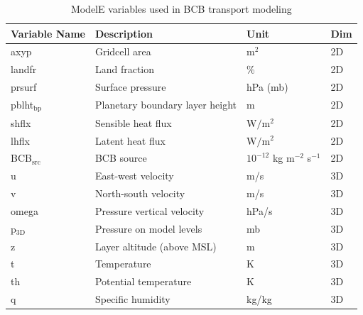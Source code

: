 \documentclass{article}
\begin{document}
    \begin{table}[htbp]
        \centering
        \caption{ModelE variables used in BCB transport modeling}
        \label{tab:model_variables}
        \begin{tabular}{llll}
            \hline
            Variable Name       & Description                       & Unit                               & Dim \\ \hline
            axyp                & Gridcell area                     & $\text{m}^2$                       & 2D  \\
            landfr              & Land fraction                     & \%                                 & 2D  \\
            prsurf              & Surface pressure                  & hPa (mb)                           & 2D  \\
            pblht$_{\text{bp}}$ & Planetary boundary layer height   & m                                  & 2D  \\
            shflx               & Sensible heat flux                & $\text{W}/\text{m}^2$              & 2D  \\
            lhflx               & Latent heat flux                  & $\text{W}/\text{m}^2$              & 2D  \\
            BCB$_{\text{src}}$  & BCB source                        & $10^{-12}$ kg m$^{-2}$ s$^{-1}$    & 2D  \\
            u                   & East-west velocity                & m/s                                & 3D  \\
            v                   & North-south velocity              & m/s                                & 3D  \\
            omega               & Pressure vertical velocity        & hPa/s                              & 3D  \\
            p$_{\text{3D}}$     & Pressure on model levels          & mb                                 & 3D  \\
            z                   & Layer altitude (above MSL)        & m                                  & 3D  \\
            t                   & Temperature                       & K                                  & 3D  \\
            th                  & Potential temperature             & K                                  & 3D  \\
            q                   & Specific humidity                 & kg/kg                              & 3D  \\

\end{tabular}
\end{table}
\end{document}
